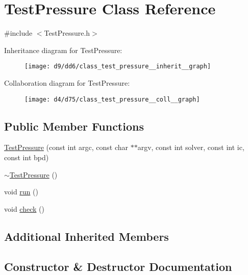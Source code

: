 \hypertarget{class_test_pressure}{}\section{Test\+Pressure Class Reference}
\label{class_test_pressure}


{\ttfamily \#include $<$Test\+Pressure.\+h$>$}



Inheritance diagram for Test\+Pressure\+:\nopagebreak
\begin{figure}[H]
\begin{center}
\leavevmode
\texttt{[image: d9/dd6/class\_test\_pressure\_\_inherit\_\_graph]}
\end{center}
\end{figure}


Collaboration diagram for Test\+Pressure\+:\nopagebreak
\begin{figure}[H]
\begin{center}
\leavevmode
\texttt{[image: d4/d75/class\_test\_pressure\_\_coll\_\_graph]}
\end{center}
\end{figure}
\subsection*{Public Member Functions}
\begin{DoxyCompactItemize}
\item 
\hyperlink{class_test_pressure_aa12dc73e28bfcb9a6f4769a86f66cbd4}{Test\+Pressure} (const int argc, const char $\ast$$\ast$argv, const int solver, const int ic, const int bpd)
\item 
\hyperlink{class_test_pressure_afac725ff3ee6ab0af5073c8c9e265955}{$\sim$\+Test\+Pressure} ()
\item 
void \hyperlink{class_test_pressure_aee46e2616c4d54889402fcfb02c4ccf5}{run} ()
\item 
void \hyperlink{class_test_pressure_a31deb76fa2f4b531225113044e3f3417}{check} ()
\end{DoxyCompactItemize}
\subsection*{Additional Inherited Members}


\subsection{Constructor \& Destructor Documentation}
\hypertarget{class_test_pressure_aa12dc73e28bfcb9a6f4769a86f66cbd4}{}
